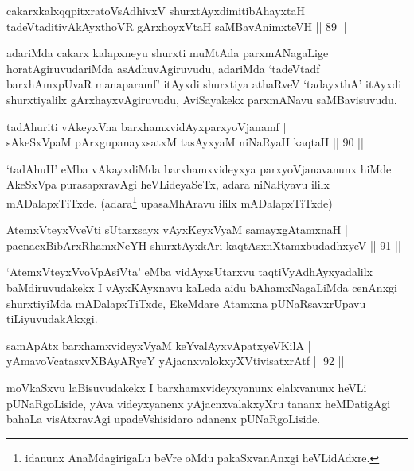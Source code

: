 \begin{shl}
cakarxkalxqqpitxratoV\s sAdhivxV shurxtAyxdimitibAhayxtaH |\\
tadeVtaditivAkAyxthoVR gArxhoyxV\s taH saMBavAnimxteVH \hfill || 89 ||
\end{shl}

\begin{artha}
adariMda cakarx kalapxneyu shurxti muMtAda parxmANagaLige horatAgiruvudariMda asAdhuvAgiruvudu, adariMda `tadeVtadf barxhAmxpUvaR manaparamf' itAyxdi shurxtiya athaRveV `tadayxthA' itAyxdi shurxtiyalilx gArxhayxvAgiruvudu, AviSayakekx parxmANavu saMBavisuvudu.
\end{artha}

\begin{shl}
tadAhuriti vAkeyxVna barxhamxvidAyxparxyoVjanamf |\\
sAkeSxVpaM pArxgupanayxsatxM tasAyxyaM niNaRyaH kaqtaH \hfill || 90 ||
\end{shl}

\begin{artha}
`tadAhuH' eMba vAkayxdiMda barxhamxvideyxya parxyoVjanavanunx hiMde
  AkeSxVpa purasapxravAgi heVLideyaSeTx, adara niNaRyavu ililx
  mADalapxTiTxde. (adara\footnote{idanunx AnaMdagirigaLu beVre oMdu
  pakaSxvanAnxgi heVLidAdxre.} upasaMhAravu ililx mADalapxTiTxde) 
\end{artha}


\begin{shl}
AtemxVteyxVveVti sUtarxsayx vAyxKeyxVyaM samayxgAtamxnaH |\\
pacnacxBibArxRhamxNeYH shurxtAyx\s kAri kaqtAsxnXtamxbudadhxyeV \hfill || 91 ||
\end{shl}

\begin{artha}
`AtemxVteyxVvoVpAsiVta' eMba vidAyxsUtarxvu taqtiVyAdhAyxyadalilx baMdiruvudakekx I   vAyxKAyxnavu kaLeda aidu bAhamxNagaLiMda cenAnxgi shurxtiyiMda   mADalapxTiTxde, EkeMdare Atamxna pUNaRsavxrUpavu tiLiyuvudakAkxgi.
\end{artha}

\begin{shl}
samApAtx barxhamxvideyxVyaM keYvalAyxvApatxyeV\s KilA |\\
yAmavoVcatasxvXBAyARyeY yAjacnxvalokxyXV\s tivisatxrAtf \hfill || 92 ||
\end{shl}

\begin{artha}
moVkaSxvu laBisuvudakekx I barxhamxvideyxyanunx elalxvanunx heVLi pUNaRgoLiside, yAva videyxyanenx yAjacnxvalakxyXru tananx heMDatigAgi bahaLa visAtxravAgi upadeVshisidaro adanenx pUNaRgoLiside.
\end{artha}

